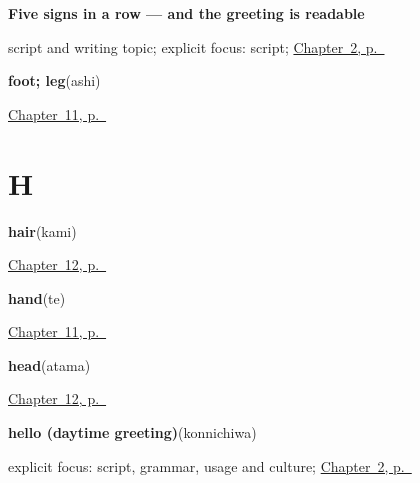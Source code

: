 \noindent\begin{minipage}[t]{\linewidth}
\raggedright
\textbf{Five signs in a row — and the greeting is readable}\par
\footnotesize script and writing topic; explicit focus: script; \hyperref[ch:ja-daytime-greeting]{Chapter~2, p.~\pageref*{ch:ja-daytime-greeting}}
\end{minipage}\par\smallskip

\noindent\begin{minipage}[t]{\linewidth}
\raggedright
\textbf{foot; leg}\enspace\emph{}\enspace(ashi)\par
\footnotesize \hyperref[ch:ja-body-seven]{Chapter~11, p.~\pageref*{ch:ja-body-seven}}
\end{minipage}\par\smallskip

\section*{H}

\noindent\begin{minipage}[t]{\linewidth}
\raggedright
\textbf{hair}\enspace\emph{}\enspace(kami)\par
\footnotesize \hyperref[ch:ja-body-seven-more]{Chapter~12, p.~\pageref*{ch:ja-body-seven-more}}
\end{minipage}\par\smallskip

\noindent\begin{minipage}[t]{\linewidth}
\raggedright
\textbf{hand}\enspace\emph{}\enspace(te)\par
\footnotesize \hyperref[ch:ja-body-seven]{Chapter~11, p.~\pageref*{ch:ja-body-seven}}
\end{minipage}\par\smallskip

\noindent\begin{minipage}[t]{\linewidth}
\raggedright
\textbf{head}\enspace\emph{}\enspace(atama)\par
\footnotesize \hyperref[ch:ja-body-seven-more]{Chapter~12, p.~\pageref*{ch:ja-body-seven-more}}
\end{minipage}\par\smallskip

\noindent\begin{minipage}[t]{\linewidth}
\raggedright
\textbf{hello (daytime greeting)}\enspace\emph{}\enspace(konnichiwa)\par
\footnotesize explicit focus: script, grammar, usage and culture; \hyperref[ch:ja-daytime-greeting]{Chapter~2, p.~\pageref*{ch:ja-daytime-greeting}}
\end{minipage}\par\smallskip

